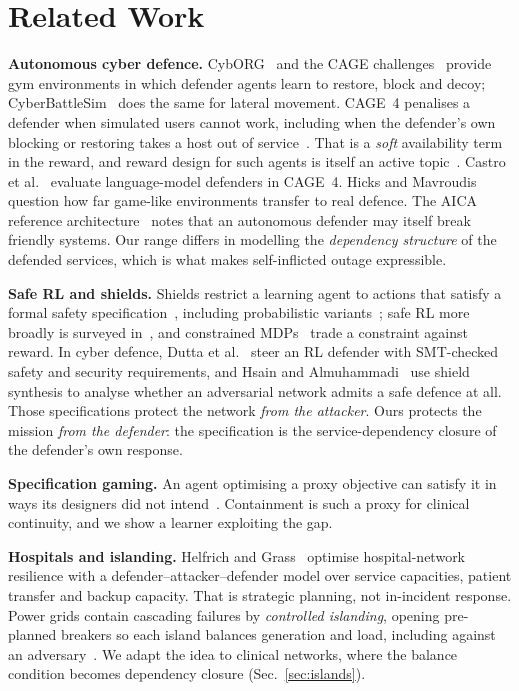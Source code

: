 \documentclass[conference,compsoc]{IEEEtran}
\begin{document}
\section{Related Work}
\label{sec:related}

\textbf{Autonomous cyber defence.} CybORG~\cite{standen2021} and the CAGE
challenges~\cite{cage4} provide gym environments in which defender agents
learn to restore, block and decoy; CyberBattleSim~\cite{cyberbattlesim}
does the same for lateral movement. CAGE~4 penalises a defender when
simulated users cannot work, including when the defender's own blocking or
restoring takes a host out of service~\cite{cage4}. That is a \emph{soft}
availability term in the reward, and reward design for such agents is
itself an active topic~\cite{bates2023}. Castro et al.~\cite{castro2025}
evaluate language-model defenders in CAGE~4. Hicks and
Mavroudis~\cite{hicks2024} question how far game-like environments
transfer to real defence. The AICA reference architecture~\cite{kott2018aica}
notes that an autonomous defender may itself break friendly systems. Our
range differs in modelling the \emph{dependency structure} of the defended
services, which is what makes self-inflicted outage expressible.

\textbf{Safe RL and shields.} Shields restrict a learning agent to actions
that satisfy a formal safety specification~\cite{alshiekh2018}, including
probabilistic variants~\cite{jansen2018}; safe RL more broadly is surveyed
in~\cite{garcia2015}, and constrained MDPs~\cite{altman1999} trade a
constraint against reward. In cyber defence, Dutta et al.~\cite{dutta2021}
steer an RL defender with SMT-checked safety and security requirements,
and Hsain and Almuhammadi~\cite{hsain2026} use shield synthesis to analyse
whether an adversarial network admits a safe defence at all. Those
specifications protect the network \emph{from the attacker}. Ours protects
the mission \emph{from the defender}: the specification is the
service-dependency closure of the defender's own response.

\textbf{Specification gaming.} An agent optimising a proxy objective can
satisfy it in ways its designers did not intend~\cite{amodei2016}.
Containment is such a proxy for clinical continuity, and we show a learner
exploiting the gap.

\textbf{Hospitals and islanding.} Helfrich and Grass~\cite{helfrich2026}
optimise hospital-network resilience with a defender--attacker--defender
model over service capacities, patient transfer and backup capacity. That
is strategic planning, not in-incident response. Power grids contain
cascading failures by \emph{controlled islanding}, opening pre-planned
breakers so each island balances generation and load, including against
an adversary~\cite{niu2021}. We adapt the idea to clinical networks, where
the balance condition becomes dependency closure (Sec.~\ref{sec:islands}).
\end{document}
